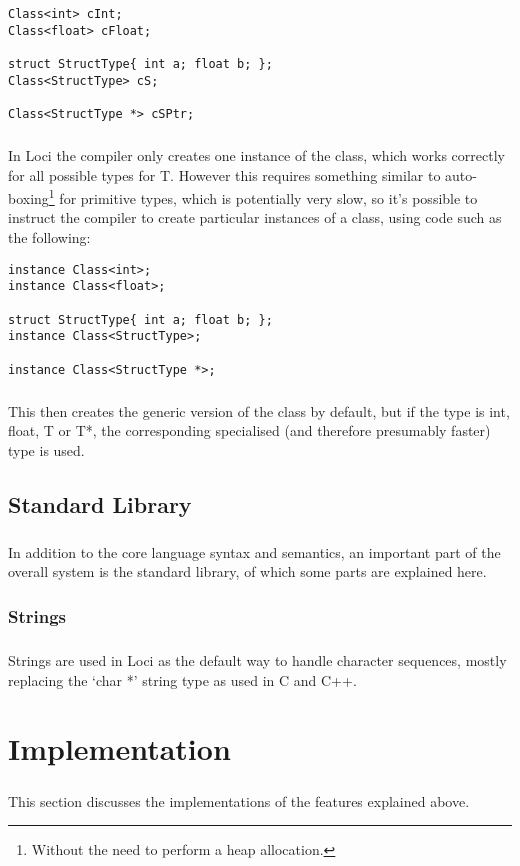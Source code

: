 \documentclass[12pt,twoside,notitlepage]{report}
\begin{document}
\small{
\begin{verbatim}
Class<int> cInt;
Class<float> cFloat;

struct StructType{ int a; float b; };
Class<StructType> cS;

Class<StructType *> cSPtr;
\end{verbatim}
}

\paragraph{}
In Loci the compiler only creates one instance of the class, which works correctly for all possible types for T. However this requires something similar to auto-boxing\footnote{Without the need to perform a heap allocation.} for primitive types, which is potentially very slow, so it's possible to instruct the compiler to create particular instances of a class, using code such as the following:

\small{
\begin{verbatim}
instance Class<int>;
instance Class<float>;

struct StructType{ int a; float b; };
instance Class<StructType>;

instance Class<StructType *>;
\end{verbatim}
}

\paragraph{}
This then creates the generic version of the class by default, but if the type is int, float, T or T*, the corresponding specialised (and therefore presumably faster) type is used.

\section{Standard Library}

\paragraph{}
In addition to the core language syntax and semantics, an important part of the overall system is the standard library, of which some parts are explained here.

\subsection{Strings}

\paragraph{}
Strings are used in Loci as the default way to handle character sequences, mostly replacing the `char *' string type as used in C and C++.

\cleardoublepage

\chapter{Implementation}

\paragraph{}
This section discusses the implementations of the features explained above.
\end{document}
